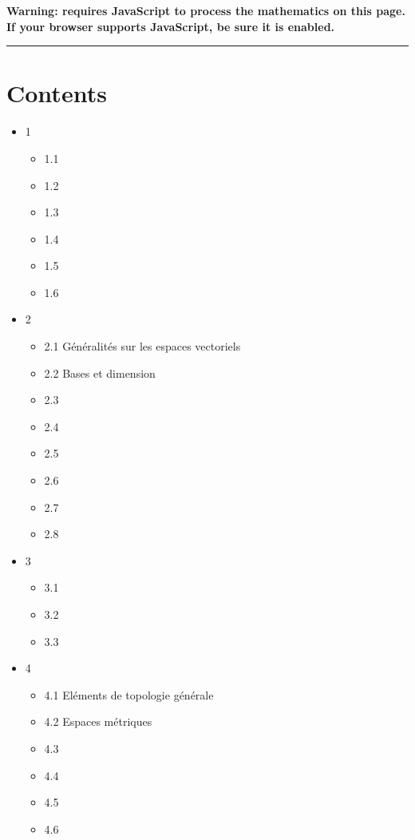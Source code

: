 \documentclass{article}
\author{}
\date{}
\begin{document}
\textbf{Warning: 
requires JavaScript to process the mathematics on this page.\\ If your
browser supports JavaScript, be sure it is enabled.}

\begin{center}\rule{3in}{0.4pt}\end{center}

\section*{Contents}
\begin{itemize}
  \item 1
    \begin{itemize}
      \item 1.1
      \item 1.2
      \item 1.3
      \item 1.4
      \item 1.5
      \item 1.6
    \end{itemize}
  \item 2
    \begin{itemize}
      \item 2.1 Généralités sur les espaces vectoriels
      \item 2.2 Bases et dimension
      \item 2.3
      \item 2.4
      \item 2.5
      \item 2.6
      \item 2.7
      \item 2.8
    \end{itemize}
  \item 3
    \begin{itemize}
      \item 3.1
      \item 3.2
      \item 3.3
    \end{itemize}
  \item 4
    \begin{itemize}
      \item 4.1 Eléments de topologie générale
      \item 4.2 Espaces métriques
      \item 4.3
      \item 4.4
      \item 4.5
      \item 4.6

\end{itemize}
\end{itemize}
\end{document}
